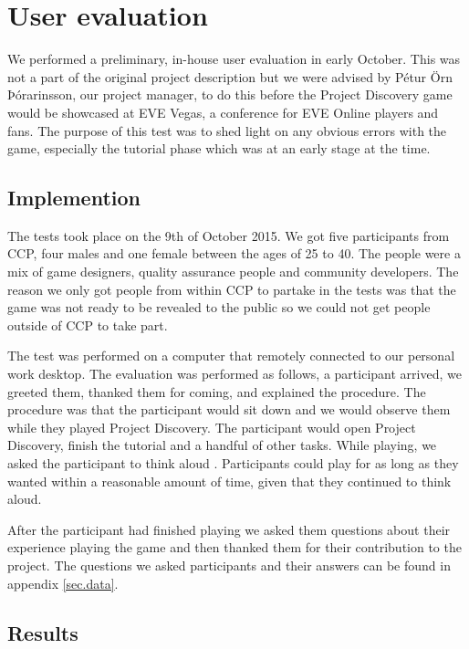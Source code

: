 \section{User evaluation}\label{sec:userevaluation}

We performed a preliminary, in-house user evaluation in early October. This was not a part of the original project description but we were advised by Pétur Örn Þórarinsson, our project manager, to do this before the Project Discovery game would be showcased at EVE Vegas, a conference for EVE Online players and fans. The purpose of this test was to shed light on any obvious errors with the game, especially the tutorial phase which was at an early stage at the time.


\subsection{Implemention}
The tests took place on the 9th of October 2015. We got five participants from CCP, four males and one female between the ages of 25 to 40. The people were a mix of game designers, quality assurance people and community developers. The reason we only got people from within CCP to partake in the tests was that the game was not ready to be revealed to the public so we could not get people outside of CCP to take part.

The test was performed on a computer that remotely connected to our personal work desktop. The evaluation was performed as follows, a participant arrived, we greeted them, thanked them for coming, and explained the procedure. The procedure was that the participant would sit down and we would observe them while they played Project Discovery. The participant would open Project Discovery, finish the tutorial and a handful of other tasks. While playing, we asked the participant to think aloud . Participants could play for as long as they wanted within a reasonable amount of time, given that they continued to think aloud.

After the participant had finished playing we asked them questions about their experience playing the game and then thanked them for their contribution to the project. The questions we asked participants and their answers can be found in appendix \ref{sec.data}.

\subsection{Results}

